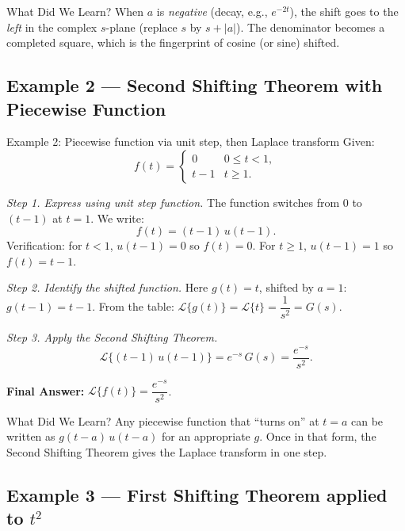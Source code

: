\documentclass[12pt,a4paper]{article}
\begin{document}
\begin{learnbox}{What Did We Learn?}
When $a$ is \emph{negative} (decay, e.g., $e^{-2t}$), the shift goes to the \emph{left} in the complex $s$-plane (replace $s$ by $s+|a|$).
The denominator becomes a completed square, which is the fingerprint of cosine (or sine) shifted.
\end{learnbox}

\subsection*{Example 2 --- Second Shifting Theorem with Piecewise Function}

\begin{infobox}{Example 2: Piecewise function via unit step, then Laplace transform}
Given:
\[
  f(t) = \begin{cases} 0 & 0 \leq t < 1, \\ t-1 & t \geq 1. \end{cases}
\]

\emph{Step 1. Express using unit step function.}
The function switches from 0 to $(t-1)$ at $t = 1$. We write:
\[
  f(t) = (t-1)\,u(t-1).
\]
Verification: for $t < 1$, $u(t-1) = 0$ so $f(t) = 0$. For $t \geq 1$, $u(t-1) = 1$ so
$f(t) = t-1$. \checkmark

\emph{Step 2. Identify the shifted function.}
Here $g(t) = t$, shifted by $a = 1$: $g(t-1) = t-1$.
From the table: $\mathcal{L}\{g(t)\} = \mathcal{L}\{t\} = \dfrac{1}{s^2} = G(s)$.

\emph{Step 3. Apply the Second Shifting Theorem.}
\[
  \mathcal{L}\{(t-1)\,u(t-1)\} = e^{-s}\,G(s) = \frac{e^{-s}}{s^2}.
\]

\textbf{Final Answer:} $\mathcal{L}\{f(t)\} = \dfrac{e^{-s}}{s^2}$.
\end{infobox}

\begin{learnbox}{What Did We Learn?}
Any piecewise function that ``turns on'' at $t = a$ can be written as $g(t-a)\,u(t-a)$ for
an appropriate $g$. Once in that form, the Second Shifting Theorem gives the Laplace transform
in one step.
\end{learnbox}

\subsection*{Example 3 --- First Shifting Theorem applied to $t^2$}
\end{document}
